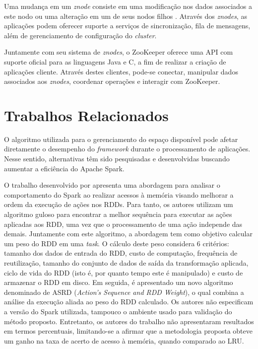 Uma mudança em um \textit{znode} consiste em uma modificação nos dados associados a este nodo ou uma alteração em um de seus nodos filhos \cite{junqueira2013Zookeeper}. Através dos \textit{znodes}, as aplicações podem oferecer suporte a serviços de sincronização, fila de mensagens, além de gerenciamento de configuração do \textit{cluster}.

Juntamente com seu sistema de \textit{znodes}, o ZooKeeper oferece uma API com suporte oficial para as linguagens Java e C, a fim de realizar a criação de aplicações cliente. Através destes clientes, pode-se conectar, manipular dados associados aos \textit{znodes}, coordenar operações e interagir com ZooKeeper.


\section{Trabalhos Relacionados} \label{sec:trab-relacionados}
O algoritmo utilizada para o gerenciamento do espaço disponível pode afetar diretamente o desempenho do \textit{framework} durante o processamento de aplicações. Nesse sentido, alternativas têm sido pesquisadas e desenvolvidas buscando aumentar a eficiência do Apache Spark.

O trabalho desenvolvido por \cite{wang2015new} apresenta uma abordagem para analisar o comportamento do Spark ao realizar acessos à memória visando melhorar a ordem da execução de ações nos RDDs. Para tanto, os autores utilizam um algoritmo guloso para encontrar a melhor sequência para executar as ações aplicadas aos RDD, uma vez que o processamento de uma ação independe das demais. Juntamente com este algoritmo, a abordagem tem como objetivo calcular um peso do RDD em uma \textit{task}. O cálculo deste peso considera 6 critérios: tamanho dos dados de entrada do RDD, custo de computação, frequência de reutilização, tamanho do conjunto de dados de saída da transformação aplicada, ciclo de vida do RDD (isto é, por quanto tempo este é manipulado) e custo de armazenar o RDD em disco. Em seguida, é apresentado um novo algoritmo denominado de ASRD (\textit{Action's Sequence and RDD Weight}), o qual combina a análise da execução aliada ao peso do RDD calculado. Os autores não especificam a versão do Spark utilizada, tampouco o ambiente usado para validação do método proposto. Entretanto, os autores do trabalho não apresentaram resultados em termos percentuais, limitando-se a afirmar que a metodologia proposta obteve um ganho na taxa de acerto de acesso à memória, quando comparado ao LRU.

